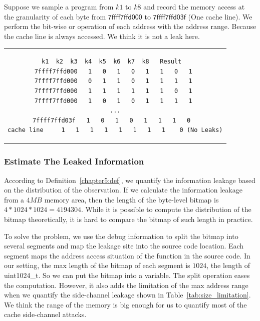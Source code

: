 \begin{myexample}
Suppose we sample a program from $k1$ to $k8$ and record the memory access at the granularity of each byte from $\mathsf{7ffff7ffd000}$ to $\mathsf{7ffff7ffd03f}$ (One cache line). We perform the bit-wise or operation of each address with the address range. Because the cache line is always accessed. We think it is not a leak here.
\begin{center}
  \begin{tabular}{c}
    {
      \begin{lstlisting}[frame=none]
              k1  k2  k3  k4  k5  k6  k7  k8   Result  
7ffff7ffd000   1   0   1   0   1   1   0   1 
7ffff7ffd000   0   1   1   0   1   1   1   1 
7ffff7ffd000   1   1   1   1   1   1   0   1 
7ffff7ffd000   1   0   1   0   1   1   1   1 
...
7ffff7ffd03f   1   0   1   0   1   1   1   0  
cache line     1   1   1   1   1   1   1   1    0 (No Leaks)
\end{lstlisting}
    }
  \end{tabular}
\end{center}
\end{myexample}

\subsubsection{Estimate The Leaked Information}
According to Definition~\ref{chapter5:def}, we quantify the information leakage based on the distribution of the observation. If we calculate the information leakage from a $4MB$ memory area, then the length of the byte-level bitmap is $4*1024*1024 = 4194304$. While it is possible to compute the distribution of the bitmap theoretically, it is hard to compare the bitmap of such length in practice.

To solve the problem, we use the debug information to split the bitmap into several segments and map the leakage site into the source code location. Each segment maps the address access situation of the function in the source code. In our setting, the max length of the bitmap of each segment is $1024$, the length of \textsf{uint1024\_t}. So we can put the bitmap into a variable. The split operation eases the computation. However, it also adds the limitation of the max address range when we quantify the side-channel leakage shown in Table~\ref{tab:size_limitation}. We think the range of the memory is big enough for us to quantify most of the cache side-channel attacks.

\begin{table}[h]
  \centering
  \caption{The maximum range address range when we quantify the amount of the leakage with different granularity.}
  \label{tab:size_limitation}
\end{table}

